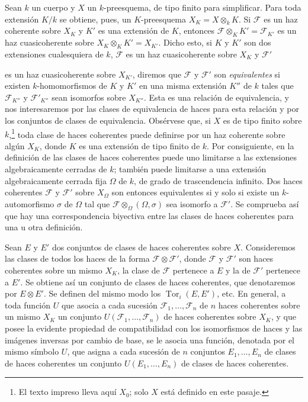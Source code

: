 \documentclass[11pt,twoside,openany]{book}
\numberwithin{equation}{section}
\newcommand{\src}[1]{%
  \phantomsection\hypertarget{src:#1}{}%
  \marginpar{\raggedleft\footnotesize\sffamily #1}%
}
\theoremstyle{plain}
\theoremstyle{definition}
\theoremstyle{remark}
\newcommand{\FgaUnitKey}{frontmatter}
\renewcommand{\src}[1]{%
  \phantomsection\hypertarget{src:\FgaUnitKey:#1}{}%
  \marginpar{\raggedleft\footnotesize\sffamily #1}%
}
\theoremstyle{plain}
\theoremstyle{definition}
\theoremstyle{remark}
\begin{document}
Sean $k$ un cuerpo y $X$ un $k$-preesquema, de tipo finito para simplificar.
Para toda extensión $K/k$ se obtiene, pues, un $K$-preesquema
$X_K=X\otimes_k K$. Si $\mathcal F$ es un haz coherente sobre $X_K$ y $K'$ es
una extensión de $K$, entonces $\mathcal F\otimes_K K'=\mathcal F_{K'}$ es un
haz cuasicoherente sobre $X_K\otimes_K K'=X_{K'}$. Dicho esto, si $K$ y $K'$
son dos extensiones cualesquiera de $k$, $\mathcal F$ es un haz cuasicoherente
sobre $X_K$ y $\mathcal F'$
\src{250}
es un haz cuasicoherente sobre $X_{K'}$, diremos que $\mathcal F$ y
$\mathcal F'$ son \emph{equivalentes} si existen $k$-homomorfismos de $K$ y
$K'$ en una misma extensión $K''$ de $k$ tales que $\mathcal F_{K''}$ y
$\mathcal F'_{K''}$ sean isomorfos sobre $X_{K''}$. Esta es una relación de
equivalencia, y nos interesaremos por las clases de equivalencia de haces para
esta relación y por los conjuntos de clases de equivalencia. Obsérvese que, si
$X$ es de tipo finito sobre $k$,\footnote{El texto impreso lleva aquí $X_0$;
solo $X$ está definido en este pasaje.} toda clase de haces coherentes puede
definirse por un haz coherente sobre algún $X_K$, donde $K$ es una extensión
de tipo finito de $k$. Por consiguiente, en la definición de las clases de
haces coherentes puede uno limitarse a las extensiones algebraicamente cerradas
de $k$; también puede limitarse a una extensión algebraicamente cerrada fija
$\Omega$ de $k$, de grado de trascendencia infinito. Dos haces coherentes
$\mathcal F$ y $\mathcal F'$ sobre $X_\Omega$ son entonces equivalentes si y
solo si existe un $k$-automorfismo $\sigma$ de $\Omega$ tal que
$\mathcal F\otimes_\Omega(\Omega,\sigma)$ sea isomorfo a $\mathcal F'$.
Se comprueba así que hay una correspondencia biyectiva entre las clases de
haces coherentes para una u otra definición.

Sean $E$ y $E'$ dos conjuntos de clases de haces coherentes sobre $X$.
Consideremos las clases de todos los haces de la forma
$\mathcal F\otimes\mathcal F'$, donde $\mathcal F$ y $\mathcal F'$ son haces
coherentes sobre un mismo $X_K$, la clase de $\mathcal F$ pertenece a $E$ y la
de $\mathcal F'$ pertenece a $E'$. Se obtiene así un conjunto de clases de
haces coherentes, que denotaremos por $E\otimes E'$. Se definen del mismo modo
los $\operatorname{Tor}_i(E,E')$, etc. En general, a toda función $U$ que
asocia a cada sucesión $\mathcal F_1,\ldots,\mathcal F_n$ de $n$ haces
coherentes sobre un mismo $X_K$ un conjunto
$U(\mathcal F_1,\ldots,\mathcal F_n)$ de haces coherentes sobre $X_K$, y que
posee la evidente propiedad de compatibilidad con los isomorfismos de haces y
las imágenes inversas por cambio de base, se le asocia una función, denotada
por el mismo símbolo $U$, que asigna a cada sucesión de $n$ conjuntos
$E_1,\ldots,E_n$ de clases de haces coherentes un conjunto
$U(E_1,\ldots,E_n)$ de clases de haces coherentes.
\end{document}
